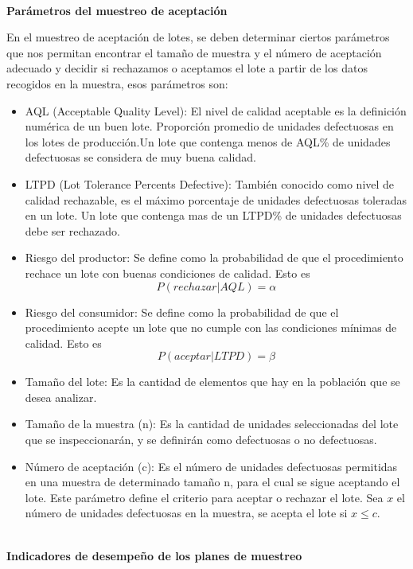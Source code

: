 ~\\\textbf{Par\'{a}metros del muestreo de aceptaci\'{o}n}

En el muestreo de aceptaci\'{o}n de lotes, se deben determinar ciertos par\'{a}metros que nos permitan encontrar el tama\~{n}o de muestra y el n\'{u}mero de aceptaci\'{o}n adecuado y decidir si rechazamos o aceptamos el lote a partir de los datos recogidos en la muestra, esos par\'{a}metros son:

\begin{itemize}
\item AQL (Acceptable Quality Level): El nivel de calidad aceptable es la definici\'{o}n num\'{e}rica de un buen lote. Proporci\'{o}n promedio de unidades defectuosas en los lotes de producci\'{o}n.Un lote que contenga menos de AQL\% de unidades defectuosas se considera de muy buena calidad.
\item LTPD (Lot Tolerance Percents Defective): Tambi\'{e}n conocido como nivel de calidad rechazable, es el m\'{a}ximo porcentaje de unidades defectuosas toleradas en un lote. Un lote que contenga mas de un LTPD\% de unidades defectuosas debe ser rechazado.
\item Riesgo del productor: Se define como la probabilidad de que el procedimiento rechace un lote con buenas condiciones de calidad. Esto es
$$P(rechazar|AQL)=\alpha$$
\item Riesgo del consumidor: Se define como la probabilidad de que el procedimiento acepte un lote que no cumple con las condiciones m\'{i}nimas de calidad. Esto es
$$P(aceptar|LTPD)=\beta$$
\item Tama\~{n}o del lote: Es la cantidad de elementos que hay en la poblaci\'{o}n que se desea analizar.
\item Tama\~{n}o de la muestra (n): Es la cantidad de unidades seleccionadas del lote que se inspeccionar\'{a}n, y se definir\'{a}n como defectuosas o no defectuosas. 
\item N\'{u}mero de aceptaci\'{o}n (c): Es el n\'{u}mero de unidades defectuosas permitidas en una muestra de determinado tama\~{n}o n, para el cual se sigue aceptando el lote. Este par\'{a}metro define el criterio para aceptar o rechazar el lote. Sea $x$ el n\'{u}mero de unidades defectuosas en la muestra, se acepta el lote si $x\leq c$.
\end{itemize}

~\\\textbf{Indicadores de desempe\~{n}o de los planes de muestreo}

